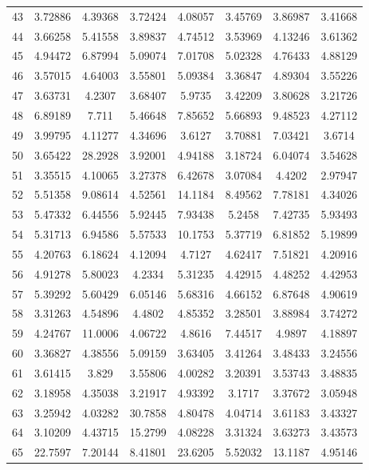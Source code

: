 \begin{center}
\begin{longtable}{cccccccc}
43 & 3.72886 & 4.39368 & 3.72424 & 4.08057 & 3.45769 & 3.86987 & 3.41668\\
44 & 3.66258 & 5.41558 & 3.89837 & 4.74512 & 3.53969 & 4.13246 & 3.61362\\
45 & 4.94472 & 6.87994 & 5.09074 & 7.01708 & 5.02328 & 4.76433 & 4.88129\\
46 & 3.57015 & 4.64003 & 3.55801 & 5.09384 & 3.36847 & 4.89304 & 3.55226\\
47 & 3.63731 & 4.2307 & 3.68407 & 5.9735 & 3.42209 & 3.80628 & 3.21726\\
48 & 6.89189 & 7.711 & 5.46648 & 7.85652 & 5.66893 & 9.48523 & 4.27112\\
49 & 3.99795 & 4.11277 & 4.34696 & 3.6127 & 3.70881 & 7.03421 & 3.6714\\
50 & 3.65422 & 28.2928 & 3.92001 & 4.94188 & 3.18724 & 6.04074 & 3.54628\\
51 & 3.35515 & 4.10065 & 3.27378 & 6.42678 & 3.07084 & 4.4202 & 2.97947\\
52 & 5.51358 & 9.08614 & 4.52561 & 14.1184 & 8.49562 & 7.78181 & 4.34026\\
53 & 5.47332 & 6.44556 & 5.92445 & 7.93438 & 5.2458 & 7.42735 & 5.93493\\
54 & 5.31713 & 6.94586 & 5.57533 & 10.1753 & 5.37719 & 6.81852 & 5.19899\\
55 & 4.20763 & 6.18624 & 4.12094 & 4.7127 & 4.62417 & 7.51821 & 4.20916\\
56 & 4.91278 & 5.80023 & 4.2334 & 5.31235 & 4.42915 & 4.48252 & 4.42953\\
57 & 5.39292 & 5.60429 & 6.05146 & 5.68316 & 4.66152 & 6.87648 & 4.90619\\
58 & 3.31263 & 4.54896 & 4.4802 & 4.85352 & 3.28501 & 3.88984 & 3.74272\\
59 & 4.24767 & 11.0006 & 4.06722 & 4.8616 & 7.44517 & 4.9897 & 4.18897\\
60 & 3.36827 & 4.38556 & 5.09159 & 3.63405 & 3.41264 & 3.48433 & 3.24556\\
61 & 3.61415 & 3.829 & 3.55806 & 4.00282 & 3.20391 & 3.53743 & 3.48835\\
62 & 3.18958 & 4.35038 & 3.21917 & 4.93392 & 3.1717 & 3.37672 & 3.05948\\
63 & 3.25942 & 4.03282 & 30.7858 & 4.80478 & 4.04714 & 3.61183 & 3.43327\\
64 & 3.10209 & 4.43715 & 15.2799 & 4.08228 & 3.31324 & 3.63273 & 3.43573\\
65 & 22.7597 & 7.20144 & 8.41801 & 23.6205 & 5.52032 & 13.1187 & 4.95146\\

\end{longtable}
\end{center}
